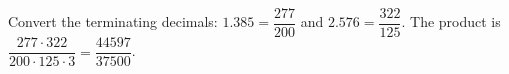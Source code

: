 Convert the terminating decimals: $1.385=\dfrac{277}{200}$ and $2.576=\dfrac{322}{125}$. The product is $\dfrac{277\cdot322}{200\cdot125\cdot3}=\boxed{\dfrac{44597}{37500}}$.
